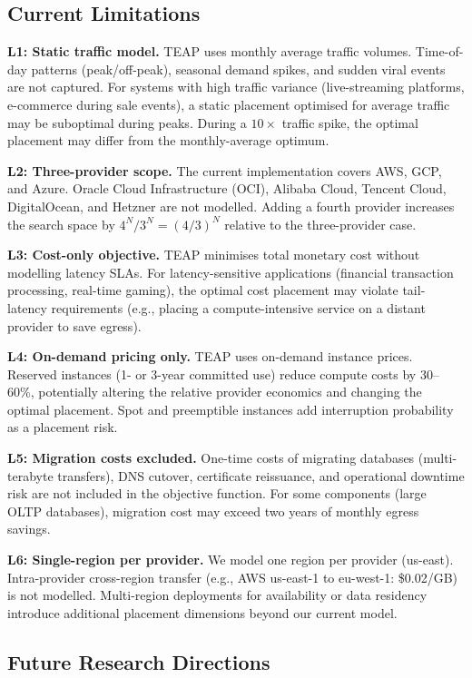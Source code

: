 \documentclass[10pt,journal]{IEEEtran}
\begin{document}
\subsection{Current Limitations}

\textbf{L1: Static traffic model.}
TEAP uses monthly average traffic volumes.
Time-of-day patterns (peak/off-peak), seasonal demand spikes, and sudden viral
events are not captured.
For systems with high traffic variance (live-streaming platforms, e-commerce
during sale events), a static placement optimised for average traffic may be
suboptimal during peaks.
During a $10\times$ traffic spike, the optimal placement may differ from the
monthly-average optimum.

\textbf{L2: Three-provider scope.}
The current implementation covers AWS, GCP, and Azure.
Oracle Cloud Infrastructure (OCI), Alibaba Cloud, Tencent Cloud, DigitalOcean,
and Hetzner are not modelled.
Adding a fourth provider increases the search space by $4^N/3^N = (4/3)^N$
relative to the three-provider case.

\textbf{L3: Cost-only objective.}
TEAP minimises total monetary cost without modelling latency SLAs.
For latency-sensitive applications (financial transaction processing, real-time
gaming), the optimal cost placement may violate tail-latency requirements
(e.g., placing a compute-intensive service on a distant provider to save egress).

\textbf{L4: On-demand pricing only.}
TEAP uses on-demand instance prices.
Reserved instances (1- or 3-year committed use) reduce compute costs by 30--60\%,
potentially altering the relative provider economics and changing the optimal
placement.
Spot and preemptible instances add interruption probability as a placement risk.

\textbf{L5: Migration costs excluded.}
One-time costs of migrating databases (multi-terabyte transfers), DNS cutover,
certificate reissuance, and operational downtime risk are not included in the
objective function.
For some components (large OLTP databases), migration cost may exceed two years
of monthly egress savings.

\textbf{L6: Single-region per provider.}
We model one region per provider (us-east).
Intra-provider cross-region transfer (e.g., AWS us-east-1 to eu-west-1:
\$0.02/GB) is not modelled.
Multi-region deployments for availability or data residency introduce
additional placement dimensions beyond our current model.

\subsection{Future Research Directions}
\end{document}
